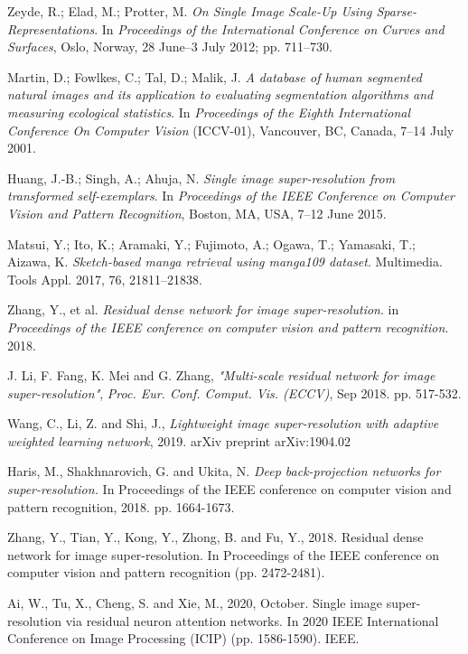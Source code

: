 \documentclass{ieeeaccess}
\begin{document}
\begin{thebibliography}{00}
 Zeyde, R.; Elad, M.; Protter, M. \textit{On Single Image Scale-Up Using Sparse-Representations}. In \textit{Proceedings of the International Conference on Curves and Surfaces}, Oslo, Norway, 28 June–3 July 2012; pp. 711–730.

 Martin, D.; Fowlkes, C.; Tal, D.; Malik, J. \textit{A database of human segmented natural images and its application to evaluating segmentation algorithms and measuring ecological statistics}. In \textit{Proceedings of the Eighth International Conference On Computer Vision} (ICCV-01), Vancouver, BC, Canada, 7–14 July 2001.

 Huang, J.-B.; Singh, A.; Ahuja, N. \textit{Single image super-resolution from transformed self-exemplars}. In \textit{Proceedings of the IEEE Conference on Computer Vision and Pattern Recognition}, Boston, MA, USA, 7–12 June 2015.

 Matsui, Y.; Ito, K.; Aramaki, Y.; Fujimoto, A.; Ogawa, T.; Yamasaki, T.; Aizawa, K. \textit{Sketch-based manga retrieval using manga109 dataset}. Multimedia. Tools Appl. 2017, 76, 21811–21838.

 Zhang, Y., et al. \textit{Residual dense network for image super-resolution}. in \textit{Proceedings of the IEEE conference on computer vision and pattern recognition}. 2018.

 J. Li, F. Fang, K. Mei and G. Zhang, \textit{"Multi-scale residual network for image super-resolution"}, \textit{Proc. Eur. Conf. Comput. Vis. (ECCV)}, Sep 2018. pp. 517-532.

 Wang, C., Li, Z. and Shi, J., \textit{Lightweight image super-resolution with adaptive weighted learning network}, 2019. arXiv preprint arXiv:1904.02

 Haris, M., Shakhnarovich, G. and Ukita, N. \textit{Deep back-projection networks for super-resolution.} In Proceedings of the IEEE conference on computer vision and pattern recognition, 2018. pp. 1664-1673.

 Zhang, Y., Tian, Y., Kong, Y., Zhong, B. and Fu, Y., 2018. Residual dense network for image super-resolution. In Proceedings of the IEEE conference on computer vision and pattern recognition (pp. 2472-2481).

 Ai, W., Tu, X., Cheng, S. and Xie, M., 2020, October. Single image super-resolution via residual neuron attention networks. In 2020 IEEE International Conference on Image Processing (ICIP) (pp. 1586-1590). IEEE.


\end{thebibliography}
\end{document}
